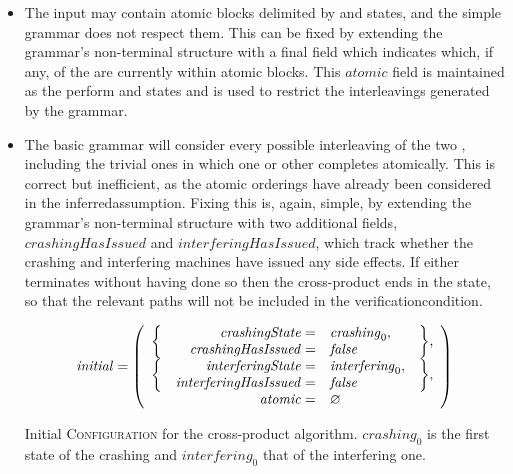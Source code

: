 \begin{itemize}
\item The input {\StateMachines} may contain atomic blocks delimited
  by {\stStartAtomic} and {\stEndAtomic} states, and the simple
  grammar does not respect them.  This can be fixed by extending the
  grammar's non-terminal structure with a final field which indicates
  which, if any, of the {\StateMachines} are currently within atomic
  blocks.  This $\mathit{atomic}$ field is maintained as the
  {\StateMachines} perform {\stStartAtomic} and {\stEndAtomic} states
  and is used to restrict the interleavings generated by the grammar.
\item The basic grammar will consider every possible interleaving of
  the two {\StateMachines}, including the trivial ones in which one or
  other completes atomically.  This is correct but inefficient, as the
  atomic orderings have already been considered in the
  \gls{inferredassumption}.  Fixing this is, again, simple, by
  extending the grammar's non-terminal structure with two additional
  fields, $\mathit{crashingHasIssued}$ and
  $\mathit{interferingHasIssued}$, which track whether the crashing
  and interfering machines have issued any side
  effects.  If either {\StateMachine} terminates
  without having done so then the cross-product {\StateMachine} ends
  in the {\stUnreached} state, so that the relevant paths will not be
  included in the \gls{verificationcondition}.

\begin{sanefig}
  \begin{displaymath}
    \mathit{initial} = \left(\begin{array}{rrll}
      \multirow{2}{*}{\bigg\{} & \mathit{crashingState} = & \mathit{crashing}_0, & \multirow{2}{*}{\bigg\},} \\
                               & \mathit{crashingHasIssued} = & \false\\
      \multirow{2}{*}{\bigg\{} & \mathit{interferingState} = & \mathit{interfering}_0, & \multirow{2}{*}{\bigg\},} \\
                               & \mathit{interferingHasIssued} = & \false\\
      \multicolumn{2}{r}{\mathit{atomic} = } & \varnothing \\
    \end{array}\right)
  \end{displaymath}
  \caption{Initial \textsc{Configuration} for the cross-product
    algorithm.  $\mathit{crashing}_0$ is the first state of the
    crashing {\StateMachine} and $\mathit{interfering}_0$ that of the
    interfering one.}
  \label{fig:cross_product:initial}
\end{sanefig}


\end{itemize}
